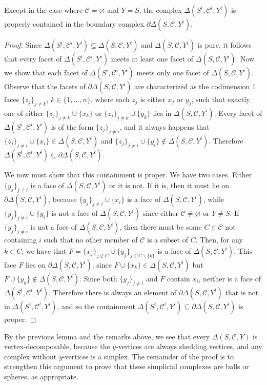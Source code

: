 \documentclass[ALCO,published]{cedram}
\numberwithin{equation}{section}
\newcommand{\sC}{\mathscr{C}}
\renewcommand{\emptyset}{\varnothing}
\newcommand{\dee}{\partial}
\newcommand{\1}{^{-1}}
\begin{document}
\begin{lem}\label{boundary}
Except in the case where $\sC = \emptyset$ and $Y=S$, the complex $\Delta(S^i,\sC^i,Y^i)$ is properly contained in the boundary complex $\dee \Delta(S,\sC,Y^i)$.
\end{lem}
\begin{proof}
Since $\Delta(S^i,\sC^i,Y^i) \subseteq \Delta(S,\sC,Y^i)$ and
$\Delta(S,\sC,Y^i)$ is pure, it follows that every facet of
$\Delta(S^i,\sC^i,Y^i)$ meets at least one facet of
$\Delta(S,\sC,Y^i)$. Now we show that each facet of
$\Delta(S^i,\sC^i,Y^i)$ meets only one facet of
$\Delta(S,\sC,Y^i)$. Observe that the facets of $\dee
\Delta(S,\sC,Y^i)$ are characterized as the codimension 1 faces
$\{z_j\}_{j \ne k}$, $k \in \{1,\dots,n\}$, where each $z_j$ is either
$x_j$ or $y_j$, such that exactly one of either $\{z_j\}_{j \ne k}
\cup \{x_k\}$ or $\{z_j\}_{j \ne k} \cup \{y_k\}$ lies in
$\Delta(S,\sC,Y^i)$. Every facet of $\Delta(S^i,\sC^i,Y^i)$ is of the
form $\{z_j\}_{j \ne i}$, and it always happens that $\{z_j\}_{j \ne
  i} \cup \{x_i\} \in \Delta(S,\sC,Y^i)$ and $\{z_j\}_{j \ne i} \cup
\{y_i\} \notin \Delta(S,\sC,Y^i)$. Therefore $\Delta(S^i,\sC^i,Y^i)
\subseteq \dee \Delta(S,\sC,Y^i)$.

We now must show that this containment is proper. We have two cases. Either $\{y_j\}_{j \ne i}$ is a face of $\Delta(S,\sC,Y^i)$ or it is not. If it is, then it must lie on $\dee \Delta(S,\sC,Y^i)$, because $\{y_j\}_{j \ne i} \cup \{x_i\}$ is a face of $\Delta(S,\sC,Y^i)$, while $\{y_j\}_{j \ne i} \cup \{y_i\}$ is not a face of $\Delta(S,\sC,Y^i)$ since either $\sC \ne \emptyset$ or $Y \ne S$. If $\{y_j\}_{j \ne i}$ is not a face of $\Delta(S,\sC,Y^i)$, then there must be some $C \in \sC$ not containing $i$ such that no other member of $\sC$ is a subset of $C$. Then, for any $k \in C$, we have that $F = \{x_j\}_{j \notin C} \cup \{y_j\}_{j \in C\smallsetminus\{k\}}$ is a face of $\Delta(S,\sC,Y^i)$. This face $F$ lies on $\dee \Delta(S,\sC,Y^i)$, since $F \cup \{x_k\} \in \Delta(S,\sC,Y^i)$ but $F \cup \{y_k\} \notin \Delta(S,\sC,Y^i)$. Since both $\{y_j\}_{j \ne i}$ and $F$ contain $x_i$, neither is a face of $\Delta(S^i,\sC^i,Y^i)$. Therefore there is always an element of $\dee \Delta(S,\sC,Y^i)$ that is not in $\Delta(S^i,\sC^i,Y^i)$, and so the containment $\Delta(S^i,\sC^i,Y^i) \subseteq \dee \Delta(S,\sC,Y^i)$ is proper.
\end{proof}
By the previous lemma and the remarks above, we see that every $\Delta(S,\sC,Y)$ is vertex-decomposable, because the $y$-vertices are always shedding vertices, and any complex without $y$-vertices is a simplex.  The remainder of the proof is to strengthen this argument to prove that these simplicial complexes are balls or spheres, as appropriate.
\end{document}
